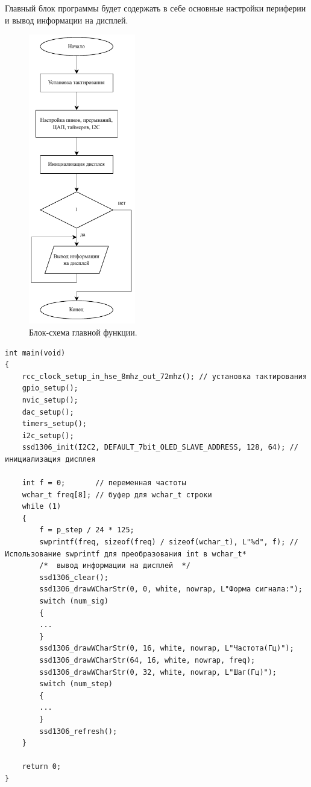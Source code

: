 	Главный блок программы будет содержать в себе основные настройки периферии и вывод информации на дисплей.
	\begin{figure}[H]
    \centering
    \includegraphics[width=0.415\textwidth]{../image/main.pdf}
    \caption{Блок-схема главной функции.}
	\end{figure}
	
\begin{code}
\begin{verbatim}
int main(void)
{
    rcc_clock_setup_in_hse_8mhz_out_72mhz(); // установка тактирования
    gpio_setup();
    nvic_setup();
    dac_setup();
    timers_setup();
    i2c_setup();
    ssd1306_init(I2C2, DEFAULT_7bit_OLED_SLAVE_ADDRESS, 128, 64); // инициализация дисплея

    int f = 0;       // переменная частоты
    wchar_t freq[8]; // буфер для wchar_t строки
    while (1)
    {
        f = p_step / 24 * 125;
        swprintf(freq, sizeof(freq) / sizeof(wchar_t), L"%d", f); // Использование swprintf для преобразования int в wchar_t*
        /*  вывод информации на дисплей  */
        ssd1306_clear();
        ssd1306_drawWCharStr(0, 0, white, nowrap, L"Форма сигнала:");
        switch (num_sig)
        {
        ...
        }
        ssd1306_drawWCharStr(0, 16, white, nowrap, L"Частота(Гц)");
        ssd1306_drawWCharStr(64, 16, white, nowrap, freq);
        ssd1306_drawWCharStr(0, 32, white, nowrap, L"Шаг(Гц)");
        switch (num_step)
        {
        ...
        }
        ssd1306_refresh();
    }

    return 0;
}
\end{verbatim}
\end{code}
	
